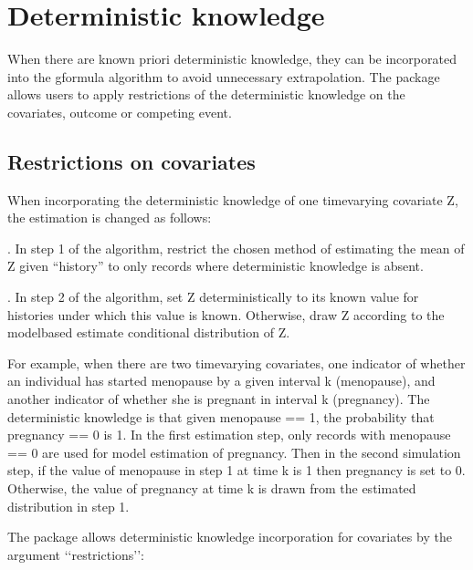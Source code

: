 \documentclass[letterpaper,10pt,english]{sphinxmanual}
\begin{document}
\section{Deterministic knowledge}
\label{\detokenize{Specifications/Deterministic knowledge:deterministic-knowledge}}\label{\detokenize{Specifications/Deterministic knowledge:id1}}\label{\detokenize{Specifications/Deterministic knowledge::doc}}
\sphinxAtStartPar
When there are known priori deterministic knowledge, they can be incorporated into the g\sphinxhyphen{}formula algorithm to avoid unnecessary
extrapolation. The package allows users to apply restrictions of the deterministic knowledge on the covariates,
outcome or competing event.


\subsection{Restrictions on covariates}
\label{\detokenize{Specifications/Deterministic knowledge:restrictions-on-covariates}}
\sphinxAtStartPar
When incorporating the deterministic knowledge of one time\sphinxhyphen{}varying covariate Z, the estimation is changed as follows:

. In step 1 of the algorithm, restrict the chosen method of estimating the mean of Z given
“history” to only records where deterministic knowledge is absent.

. In step 2 of the algorithm, set Z deterministically to its known value for histories under which this
value is known. Otherwise, draw Z according to the model\sphinxhyphen{}based estimate conditional distribution of Z.

\sphinxAtStartPar
For example, when there are two time\sphinxhyphen{}varying covariates, one indicator of whether an individual has started menopause
by a given interval k (menopause), and another indicator of whether she is pregnant in interval k (pregnancy).
The deterministic knowledge is that given menopause == 1, the probability that pregnancy == 0 is 1. In the first
estimation step, only records with menopause == 0 are used for model estimation of pregnancy. Then in the second
simulation step, if the value of menopause in step 1 at time k is 1 then pregnancy is set to 0. Otherwise, the value
of pregnancy at time k is drawn from the estimated distribution in step 1.

\sphinxAtStartPar
The package allows deterministic knowledge incorporation for covariates by the argument ‘‘restrictions’’:
\end{document}
